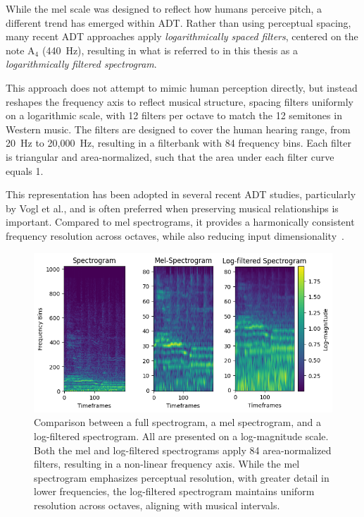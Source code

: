 While the mel scale was designed to reflect how humans perceive pitch, a different trend has emerged within \acrfull{ADT}. Rather than using perceptual spacing, many recent \gls{ADT} approaches apply \textit{logarithmically spaced filters}, centered on the note $\text{A}_4$ (440~Hz), resulting in what is referred to in this thesis as a \textit{logarithmically filtered spectrogram}. 

This approach does not attempt to mimic human perception directly, but instead reshapes the frequency axis to reflect musical structure, spacing filters uniformly on a logarithmic scale, with 12 filters per octave to match the 12 semitones in Western music. The filters are designed to cover the human hearing range, from 20~Hz to 20,000~Hz, resulting in a filterbank with 84 frequency bins. Each filter is triangular and area-normalized, such that the area under each filter curve equals 1.

This representation has been adopted in several recent \gls{ADT} studies, particularly by Vogl et al., and is often preferred when preserving musical relationships is important. Compared to mel spectrograms, it provides a harmonically consistent frequency resolution across octaves, while also reducing input dimensionality~\cite{Vogl2017DrumTV, vogl2018multiinstrumentdrumtranscription, jia2019deep, signals4040042, zehren2024analyzingreducingsynthetictorealtransfer}.

\begin{figure}[H]
    \centering
    \hspace*{-0.6cm}
    \includegraphics[scale=0.9]{figures/allspectrograms}
    \caption{Comparison between a full spectrogram, a mel spectrogram, and a log-filtered spectrogram. All are presented on a log-magnitude scale. Both the mel and log-filtered spectrograms apply 84 area-normalized filters, resulting in a non-linear frequency axis. While the mel spectrogram emphasizes perceptual resolution, with greater detail in lower frequencies, the log-filtered spectrogram maintains uniform resolution across octaves, aligning with musical intervals.}
    \label{AllSpectrogramFigure}
\end{figure}


